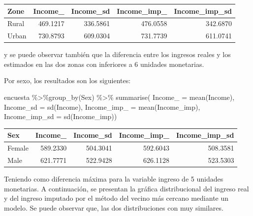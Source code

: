 \documentclass[
  12pt,
]{book}
\newenvironment{Shaded}{\begin{snugshade}}{\end{snugshade}}
\newcommand{\AttributeTok}[1]{\textcolor[rgb]{0.77,0.63,0.00}{#1}}
\newcommand{\FunctionTok}[1]{\textcolor[rgb]{0.00,0.00,0.00}{#1}}
\newcommand{\NormalTok}[1]{#1}
\newcommand{\SpecialCharTok}[1]{\textcolor[rgb]{0.00,0.00,0.00}{#1}}
\begin{document}
\begin{tabular}{l|r|r|r|r}
\hline
Zone & Income\_ & Income\_sd & Income\_imp\_ & Income\_imp\_sd\\
\hline
Rural & 469.1217 & 336.5861 & 476.0558 & 342.6870\\
\hline
Urban & 730.8793 & 609.0304 & 731.7739 & 611.0741\\
\hline
\end{tabular}

y se puede observar también que la diferencia entre los ingresos reales y los estimados en las dos zonas con inferiores a 6 unidades monetarias.

Por sexo, los resultados son los siguientes:

\begin{Shaded}
\begin{Highlighting}[]
\NormalTok{encuesta }\SpecialCharTok{\%\textgreater{}\%}\FunctionTok{group\_by}\NormalTok{(Sex) }\SpecialCharTok{\%\textgreater{}\%}  \FunctionTok{summarise}\NormalTok{(}
  \AttributeTok{Income\_ =} \FunctionTok{mean}\NormalTok{(Income),}
  \AttributeTok{Income\_sd =} \FunctionTok{sd}\NormalTok{(Income),}
  \AttributeTok{Income\_imp\_ =} \FunctionTok{mean}\NormalTok{(Income\_imp),}
  \AttributeTok{Income\_imp\_sd =} \FunctionTok{sd}\NormalTok{(Income\_imp))}
\end{Highlighting}
\end{Shaded}

\begin{tabular}{l|r|r|r|r}
\hline
Sex & Income\_ & Income\_sd & Income\_imp\_ & Income\_imp\_sd\\
\hline
Female & 589.2330 & 504.3041 & 592.6043 & 508.3581\\
\hline
Male & 621.7771 & 522.9428 & 626.1128 & 523.5303\\
\hline
\end{tabular}

Teniendo como diferencia máxima para la variable ingreso de 5 unidades monetarias. A continuación, se presentan la gráfica distribucional del ingreso real y del ingreso imputado por el método del vecino más cercano mediante un modelo. Se puede observar que, las dos distribuciones con muy similares.
\end{document}

